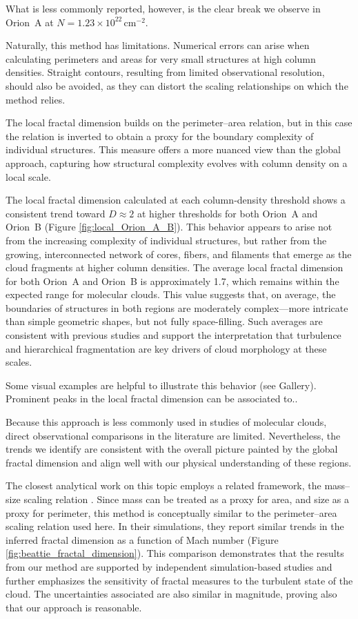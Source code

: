 What is less commonly reported, however, is the clear break we observe in Orion~A at \(N = 1.23 \times 10^{22}\,\mathrm{cm}^{-2}\).

Naturally, this method has limitations.  
Numerical errors can arise when calculating perimeters and areas for very small structures at high column densities.  
Straight contours, resulting from limited observational resolution, should also be avoided, as they can distort the scaling relationships on which the method relies.

The local fractal dimension builds on the perimeter–area relation, but in this case the relation is inverted to obtain a proxy for the boundary complexity of individual structures.  
This measure offers a more nuanced view than the global approach, capturing how structural complexity evolves with column density on a local scale.

The local fractal dimension calculated at each column‑density threshold shows a consistent trend toward \(D \approx 2\) at higher thresholds for both Orion~A and Orion~B (Figure \ref{fig:local_Orion_A_B}).  
This behavior appears to arise not from the increasing complexity of individual structures, but rather from the growing, interconnected network of cores, fibers, and filaments that emerge as the cloud fragments at higher column densities.
The average local fractal dimension for both Orion~A and Orion~B is approximately 1.7, which remains within the expected range for molecular clouds. This value suggests that, on average, the boundaries of structures in both regions are moderately complex—more intricate than simple geometric shapes, but not fully space-filling. Such averages are consistent with previous studies and support the interpretation that turbulence and hierarchical fragmentation are key drivers of cloud morphology at these scales.

Some visual examples are helpful to illustrate this behavior (see Gallery).  
Prominent peaks in the local fractal dimension can be associated to..

Because this approach is less commonly used in studies of molecular clouds, direct observational comparisons in the literature are limited.  
Nevertheless, the trends we identify are consistent with the overall picture painted by the global fractal dimension and align well with our physical understanding of these regions.

The closest analytical work on this topic employs a related framework, the mass–size scaling relation \cite{beattie2019relation}.  
Since mass can be treated as a proxy for area, and size as a proxy for perimeter, this method is conceptually similar to the perimeter–area scaling relation used here.  
In their simulations, they report similar trends in the inferred fractal dimension as a function of Mach number (Figure \ref{fig:beattie_fractal_dimension}).
This comparison demonstrates that the results from our method are supported by independent simulation-based studies and further emphasizes the sensitivity of fractal measures to the turbulent state of the cloud. The uncertainties associated are also similar in magnitude, proving also that our approach is reasonable.

